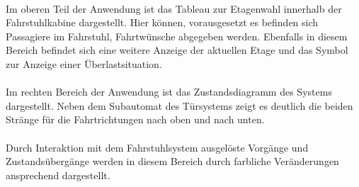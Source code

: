 \paragraph{}Im oberen Teil der Anwendung ist das Tableau zur Etagenwahl innerhalb der Fahrstuhlkabine dargestellt. Hier können, vorausgesetzt es befinden sich Passagiere im Fahrstuhl, Fahrtwünsche abgegeben werden. Ebenfalls in diesem Bereich befindet sich eine weitere Anzeige der aktuellen Etage und das Symbol zur Anzeige einer Überlastsituation. 

\paragraph{}Im rechten Bereich der Anwendung ist das Zustandsdiagramm des Systems dargestellt. Neben dem Subautomat des Türsystems zeigt es deutlich die beiden Stränge für die Fahrtrichtungen nach oben und nach unten.

\paragraph{}Durch Interaktion mit dem Fahrstuhlsystem ausgelöste Vorgänge und Zustandsübergänge werden in diesem Bereich durch farbliche Veränderungen ansprechend dargestellt. 

